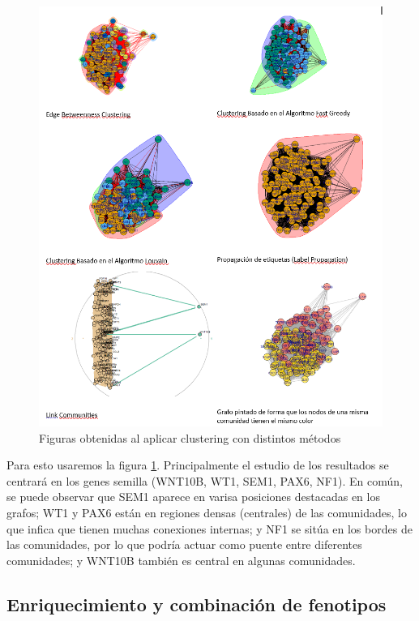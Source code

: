 \begin{figure}[!h] %
	\centering
	\includegraphics[width=1\textwidth]{figures/toda_figuras_clustering.png}
	\caption{Figuras obtenidas al aplicar clustering con distintos métodos}
	\label{clustering}
\end{figure}

Para esto usaremos la figura \ref{clustering}. Principalmente el estudio de los resultados se centrará en los genes semilla (WNT10B, WT1, SEM1, PAX6, NF1). En común, se puede observar que SEM1 aparece en varisa posiciones destacadas en los grafos; WT1 y PAX6 están en regiones densas (centrales) de las comunidades, lo que infica que tienen muchas conexiones internas; y NF1 se sitúa en los bordes de las comunidades, por lo que podría actuar como puente entre diferentes comunidades; y WNT10B también es central en algunas comunidades.


\subsection{Enriquecimiento y combinación de fenotipos}

